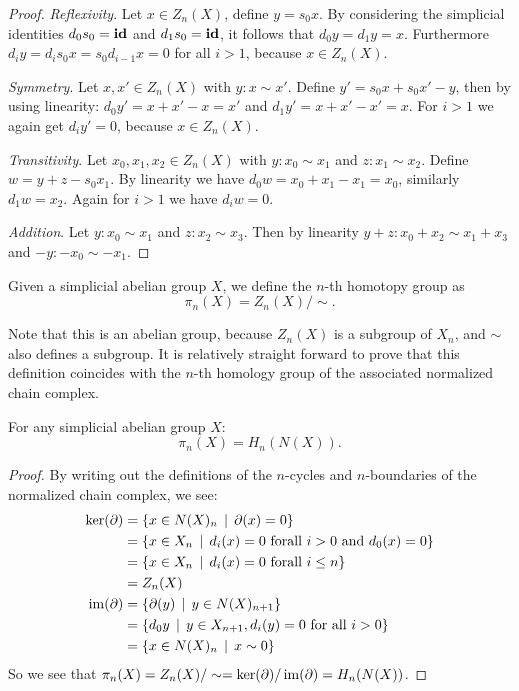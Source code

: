 \begin{proof}
	\emph{Reflexivity}. Let $x \in Z_n(X)$, define $y = s_0 x$. By considering the simplicial identities $d_0 s_0 = \mathbf{id}$ and $d_1 s_0 = \mathbf{id}$, it follows that $d_0 y = d_1 y = x$. Furthermore $d_i y = d_i s_0 x = s_0 d_{i-1} x = 0$ for all $i > 1$, because $x \in Z_n(X)$.

	\emph{Symmetry}. Let $x, x' \in Z_n(X)$ with $y: x \sim x'$. Define $y' = s_0 x + s_0 x' - y$, then by using linearity: $d_0 y' = x + x' - x = x'$ and $d_1 y' = x + x' - x' = x$. For $i>1$ we again get $d_i y' = 0$, because $x \in Z_n(X)$.

	\emph{Transitivity}. Let $x_0, x_1, x_2 \in Z_n(X)$ with $y: x_0 \sim x_1$ and $z: x_1 \sim x_2$. Define $w = y + z - s_0 x_1$. By linearity we have $d_0 w = x_0 + x_1 -x_1 = x_0$, similarly $d_1 w = x_2$. Again for $i>1$ we have $d_i w = 0$.

	\emph{Addition}. Let $y: x_0 \sim x_1$ and $z: x_2 \sim x_3$. Then by linearity $y + z: x_0 + x_2 \sim x_1 + x_3$ and $-y: -x_0 \sim -x_1$.
\end{proof}

\begin{definition}
	Given a simplicial abelian group $X$, we define the $n$-th homotopy group as
	$$ \pi_n(X) = Z_n(X) / \sim. $$
\end{definition}

Note that this is an abelian group, because $Z_n(X)$ is a subgroup of $X_n$, and $\sim$ also defines a subgroup. It is relatively straight forward to prove that this definition coincides with the $n$-th homology group of the associated normalized chain complex.

\begin{lemma}
	For any simplicial abelian group $X$:
	$$ \pi_n(X) = H_n(N(X)). $$
\end{lemma}
\begin{proof}
	By writing out the definitions of the $n$-cycles and $n$-boundaries of the normalized chain complex, we see:
	\begin{align*}
		\ker(\partial) &= \{ x \in N(X)_n \,\mid\, \partial(x) = 0 \} \\
			&= \{ x \in X_n \,\mid\, d_i(x) = 0 \text{ forall } i > 0 \text{ and } d_0(x) = 0 \} \\
			&= \{ x \in X_n \,\mid\, d_i(x) = 0 \text{ forall } i \leq n \} \\
			&= Z_n(X) \\
		\operatorname{im}(\partial) &= \{ \partial(y) \,\mid\, y \in N(X)_{n+1} \} \\
			&= \{ d_0 y \,\mid\, y \in X_{n+1}, d_i(y) = 0 \text{ for all } i > 0 \} \\
			&= \{ x \in N(X)_n \,\mid\, x \sim 0 \}
	\end{align*}
	So we see that $\pi_n(X) = Z_n(X) / \sim = \ker(\partial) / \operatorname{im}(\partial) = H_n(N(X))$.
\end{proof}


